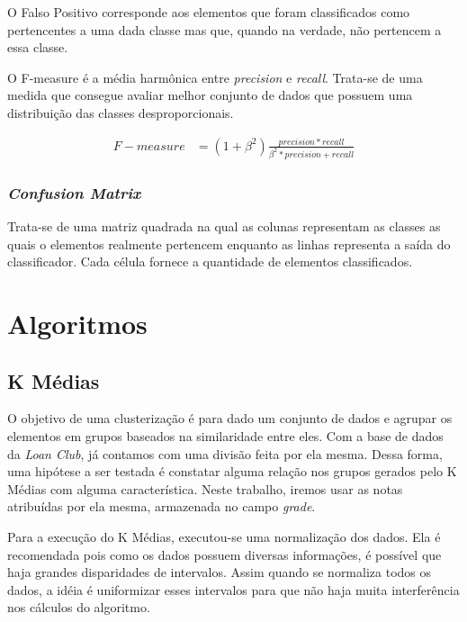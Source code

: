 O Falso Positivo corresponde aos elementos que foram classificados como pertencentes a uma dada classe mas que, quando na verdade, não pertencem a essa classe.

O F-measure é a média harmônica entre \emph{precision} e \emph{recall}. Trata-se de uma medida que consegue avaliar melhor conjunto de dados que possuem uma distribuição das classes desproporcionais. 

\begin{equation}
  \label{eq:precision}
  \begin{aligned}
F-measure &= (1 + \beta^{2})\frac{precision*recall}{\beta^{2}*precision + recall} 
  \end{aligned}  
\end{equation}

\subsubsection{\emph{Confusion Matrix}}
Trata-se de uma matriz quadrada na qual 
as colunas representam as classes as quais o elementos realmente pertencem enquanto as linhas representa a saída do classificador. Cada célula fornece a quantidade de elementos classificados.

\section{Algoritmos}

\subsection{K Médias}

O objetivo de uma clusterização é para dado um conjunto de dados e agrupar os elementos em grupos baseados na similaridade entre eles. Com a base de dados da \emph{Loan Club}, já contamos com uma divisão feita por ela mesma. Dessa forma, uma hipótese a ser testada é constatar alguma relação nos grupos gerados pelo K Médias com alguma característica. Neste trabalho, iremos usar as notas atribuídas por ela mesma, armazenada no campo \emph{grade}.

Para a execução do K Médias, executou-se uma normalização dos dados. Ela é recomendada pois como os dados possuem diversas informações, é possível que haja grandes disparidades de intervalos. Assim quando se normaliza todos os dados, a idéia é uniformizar esses intervalos para que não haja muita interferência nos cálculos do algoritmo. 

